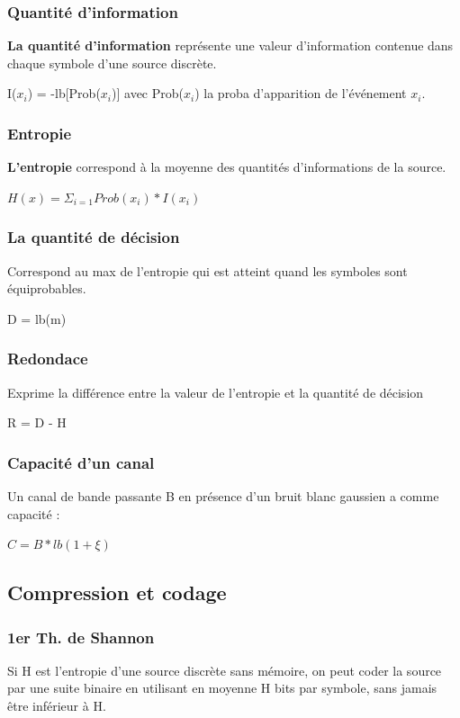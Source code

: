\documentclass[12pt]{article}
\begin{document}
\subsubsection*{Quantité d'information}

\textbf{La quantité d'information} représente une valeur d'information contenue dans chaque symbole d'une source discrète.

\colorbox{blue!20}{I($x_i$) = -lb[Prob($x_i$)]} avec Prob($x_i$) la proba d'apparition de l'événement $x_i$.

\subsubsection*{Entropie}
\textbf{L'entropie} correspond à la moyenne des quantités d'informations de la source.

\colorbox{blue!20}{$H(x) = \Sigma_{i=1}Prob(x_i)*I(x_i)$}

\subsubsection*{La quantité de décision}
Correspond au max de l'entropie qui est atteint quand les symboles sont équiprobables.

\colorbox{blue!20}{D = lb(m)}

\subsubsection*{Redondace}

Exprime la différence entre la valeur de l'entropie et la quantité de décision

\colorbox{blue!20}{R = D - H}

\subsubsection*{Capacité d'un canal}
Un canal de bande passante B en présence d'un bruit blanc gaussien a comme capacité :

\colorbox{blue!20}{$C = B * lb(1+\xi)$}

\subsection*{Compression et codage}
\subsubsection*{1er Th. de Shannon}
Si H est l'entropie d'une source discrète sans mémoire, on peut coder la source par une suite binaire en utilisant en moyenne H bits par symbole, sans jamais être inférieur à H.
\vspace*{10pt}
\end{document}
